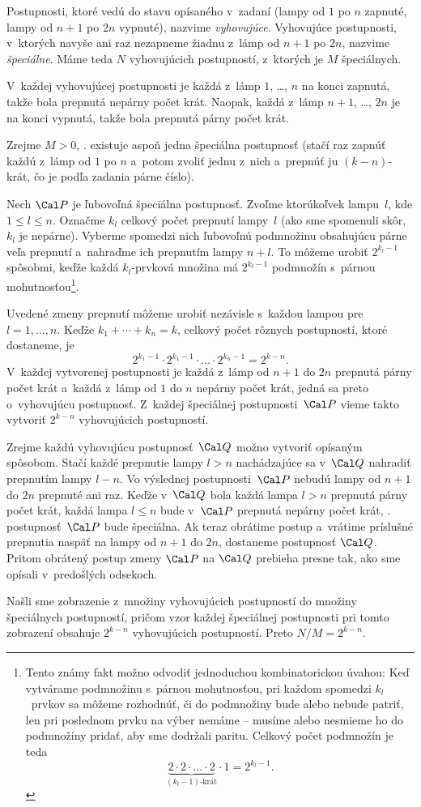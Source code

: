 {%
Postupnosti, ktoré vedú do stavu opísaného v~zadaní (lampy od $1$ po $n$ zapnuté, lampy od $n+1$ po $2n$ vypnuté), nazvime {\it vyhovujúce}. Vyhovujúce postupnosti, v~ktorých navyše ani raz nezapneme žiadnu z~lámp od $n+1$ po $2n$, nazvime {\it špeciálne}. Máme teda $N$ vyhovujúcich postupností, z~ktorých je $M$ špeciálnych.

V~každej vyhovujúcej postupnosti je každá z~lámp $1$, \dots, $n$ na konci zapnutá, takže bola prepnutá nepárny počet krát. Naopak, každá z~lámp $n+1$, \dots, $2n$ je na konci vypnutá, takže bola prepnutá párny počet krát.

Zrejme $M>0$, \tj. existuje aspoň jedna špeciálna postupnosť (stačí raz zapnúť každú z~lámp od $1$ po $n$ a~potom zvoliť jednu z~nich a~prepnúť ju $(k-n)$-krát, čo je podľa zadania párne číslo).

Nech $\Cal P$ je ľubovoľná špeciálna postupnosť. Zvoľme ktorúkoľvek lampu~$l$, kde $1\le l\le n$. Označme $k_l$ celkový počet prepnutí lampy~$l$ (ako sme spomenuli skôr, $k_l$ je nepárne). Vyberme spomedzi nich ľubovoľnú podmnožinu obsahujúcu párne veľa prepnutí a~nahraďme ich prepnutím lampy $n+l$. To môžeme urobiť $2^{k_l-1}$ spôsobmi, keďže každá $k_l$-prvková množina má $2^{k_l-1}$ podmnožín s~párnou mohutnosťou\footnote{Tento známy fakt možno odvodiť jednoduchou kombinatorickou úvahou: Keď vytvárame podmnožinu s~párnou mohutnosťou, pri každom spomedzi $k_l$~prvkov sa môžeme rozhodnúť, či do podmnožiny bude alebo nebude patriť, len pri poslednom prvku na výber nemáme -- musíme alebo nesmieme ho do podmnožiny pridať, aby sme dodržali paritu. Celkový počet podmnožín je teda $$\underbrace{2\cdot2\cdot\dots\cdot2}_{\text{$(k_l-1)$-krát}}\cdot1=2^{k_l-1}.$$}.

Uvedené zmeny prepnutí môžeme urobiť nezávisle s~každou lampou pre $l=1,\dots,n$. Keďže $k_1+\cdots+k_n=k$, celkový počet rôznych postupností, ktoré dostaneme, je
$$
2^{k_1-1}\cdot2^{k_1-1}\cdot\dots\cdot2^{k_n-1}=2^{k-n}.
$$
V~každej vytvorenej postupnosti je každá z~lámp od $n+1$ do $2n$ prepnutá párny počet krát a~každá z~lámp od $1$ do $n$ nepárny počet krát, jedná sa preto o~vyhovujúcu postupnosť. Z~každej špeciálnej postupnosti~$\Cal P$ vieme takto vytvoriť $2^{k-n}$ vyhovujúcich postupností.

Zrejme každú vyhovujúcu postupnosť~$\Cal Q$ možno vytvoriť opísaným spôsobom. Stačí každé prepnutie lampy $l>n$ nachádzajúce sa v~$\Cal Q$ nahradiť prepnutím lampy $l-n$. Vo výslednej postupnosti~$\Cal P$ nebudú lampy od $n+1$ do $2n$ prepnuté ani raz. Keďže v~$\Cal Q$ bola každá lampa $l>n$ prepnutá párny počet krát, každá lampa $l\le n$ bude v~$\Cal P$ prepnutá nepárny počet krát, \tj. postupnosť~$\Cal P$ bude špeciálna. Ak teraz obrátime postup a~vrátime príslušné prepnutia naspäť na lampy od $n+1$ do $2n$, dostaneme postupnosť $\Cal Q$. Pritom obrátený postup zmeny $\Cal P$ na $\Cal Q$ prebieha presne tak, ako sme opísali v~predošlých odsekoch.

Našli sme zobrazenie z~množiny vyhovujúcich postupností do množiny špeciálnych postupností, pričom vzor každej špeciálnej postupnosti pri tomto zobrazení obsahuje $2^{k-n}$ vyhovujúcich postupností. Preto $N/M=2^{k-n}$.
}

